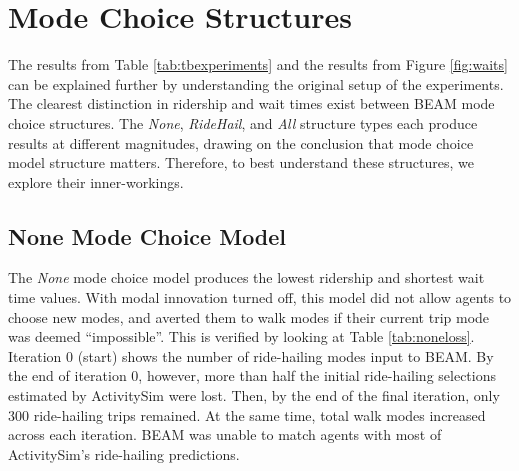 \documentclass[simple, masters, twoside]{byuthesis}
\begin{document}
\hypertarget{deep-look}{%
\section{Mode Choice Structures}\label{deep-look}}

The results from Table \ref{tab:tbexperiments} and the results from Figure \ref{fig:waits} can be explained further by understanding the original setup of the experiments. The clearest distinction in ridership and wait times exist between BEAM mode choice structures. The \emph{None}, \emph{RideHail}, and \emph{All} structure types each produce results at different magnitudes, drawing on the conclusion that mode choice model structure matters. Therefore, to best understand these structures, we explore their inner-workings.

\hypertarget{type1}{%
\subsection{None Mode Choice Model}\label{type1}}

The \emph{None} mode choice model produces the lowest ridership and shortest wait time values. With modal innovation turned off, this model did not allow agents to choose new modes, and averted them to walk modes if their current trip mode was deemed ``impossible''. This is verified by looking at Table \ref{tab:noneloss}. Iteration 0 (start) shows the number of ride-hailing modes input to BEAM. By the end of iteration 0, however, more than half the initial ride-hailing selections estimated by ActivitySim were lost. Then, by the end of the final iteration, only 300 ride-hailing trips remained. At the same time, total walk modes increased across each iteration. BEAM was unable to match agents with most of ActivitySim's ride-hailing predictions.

\begin{table}

\caption{\label{tab:noneloss}Loss of Ride-hailing Trips in the None Mode Choice Model}
\centering
{}
\end{table}
\end{document}
